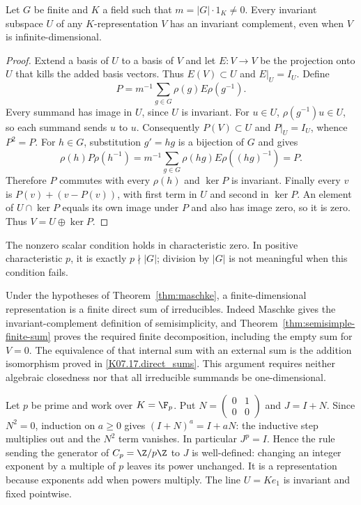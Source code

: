 \begin{theorem}\label{thm:maschke}
Let $G$ be finite and $K$ a field such that $m=|G|\cdot1_K\ne0$.
Every invariant subspace $U$ of any $K$-representation $V$ has an
invariant complement, even when $V$ is infinite-dimensional.
\end{theorem}
\begin{proof}
Extend a basis of $U$ to a basis of $V$ and let $E:V\to V$ be the
projection onto $U$ that kills the added basis vectors. Thus
$E(V)\subset U$ and $E|_U=I_U$. Define
\[
 P=m^{-1}\sum_{g\in G}\rho(g)E\rho(g^{-1}).
\]
Every summand has image in $U$, since $U$ is invariant. For $u\in U$,
$\rho(g^{-1})u\in U$, so each summand sends $u$ to $u$.
Consequently $P(V)\subset U$ and $P|_U=I_U$, whence $P^2=P$.
For $h\in G$, substitution $g'=hg$ is a bijection of $G$ and gives
\[
 \rho(h)P\rho(h^{-1})
  =m^{-1}\sum_{g\in G}\rho(hg)E\rho((hg)^{-1})=P.
\]
Therefore $P$ commutes with every $\rho(h)$ and $\ker P$ is
invariant. Finally every $v$ is
$P(v)+(v-P(v))$, with first term in $U$ and second in $\ker P$.
An element of $U\cap\ker P$ equals its own image under $P$ and
also has image zero, so it is zero. Thus $V=U\oplus\ker P$.
\end{proof}
The nonzero scalar condition holds in characteristic zero. In positive
characteristic $p$, it is exactly $p\nmid|G|$; division by $|G|$ is
not meaningful when this condition fails.

Under the hypotheses of Theorem~\ref{thm:maschke}, a
finite-dimensional representation is a finite direct sum of
irreducibles. Indeed Maschke gives the invariant-complement
definition of semisimplicity, and
Theorem~\ref{thm:semisimple-finite-sum} proves the required finite
decomposition, including the empty sum for $V=0$. The equivalence of
that internal sum with an external sum is the addition isomorphism
proved in \ref{K07.17.direct_sums}. This argument requires neither
algebraic closedness nor that all irreducible summands be one-dimensional.

Let $p$ be prime and work over $K=\F_p$. Put
$N=\left(\begin{smallmatrix}0&1\\0&0\end{smallmatrix}\right)$
and $J=I+N$. Since $N^2=0$, induction on $a\ge0$ gives
$(I+N)^a=I+aN$: the inductive step multiplies out and the $N^2$
term vanishes. In particular $J^p=I$. Hence the rule sending the
generator of $C_p=\Z/p\Z$ to $J$ is well-defined: changing an
integer exponent by a multiple of $p$ leaves its power unchanged.
It is a representation because exponents add when powers multiply.
The line $U=Ke_1$ is invariant and fixed pointwise.

